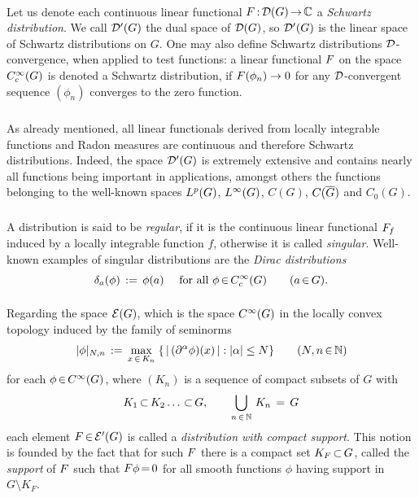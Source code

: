 \documentclass[11pt,twoside]{article}
\def\G{G}
\begin{document}
\paragraph{} %
Let us denote each continuous linear functional $\disF \: \D(\G) \xto \C$ 
a \textit{Schwartz distribution}.
We call $\D'(\G)$ the dual space of $\D(\G)$,
so $\D'(\G)$ is the linear space of Schwartz distributions on $\G$.
One may also define Schwartz distributions {\wrt} ${\mathcal{D}}$-convergence,
when applied to test functions:
a linear functional $F$ on the space $\TF$
is denoted a Schwartz distribution,
if $F(\phi_n) \to 0$ for any ${\mathcal{D}}$-convergent sequence $(\phi_n)$
converges to the zero function.

\subparagraph{}
As already mentioned,
all linear functionals derived from locally integrable functions
and Radon measures are continuous and therefore Schwartz distributions.
Indeed,
the space $\D'(\G)$ is extremely extensive
and contains nearly all functions being important in applications,
amongst others the functions
belonging to the well-known spaces $\Lp$, $\Li$, $C(\G)$,
$C(\clG)$ and $C_0(\G)$.

\subparagraph{}
A distribution is said to be \textit{regular},
if it is the continuous linear functional $F_f$
induced by a locally integrable function $f$,
otherwise it is called \textit{singular}.
Well-known examples of singular distributions are
the \textit{Dirac distributions}
\[
\delta_a(\phi) \, := \, \phi(a)
\qfa \phi \xeof \TF
\quad \quad  (a \xeof \G).
\]

\paragraph{} %
Regarding the space $\E(\G)$,
which is the space $\SF$ in the locally convex topology
induced by the family of seminorms
\[
\abs{\phi} _{N,n}
\, := \,
\max_{x \xeof K_n} \;
\{ \, \abs{\, (\PA \phi)(x) \,} : \abs{\alpha} \leq N \}
\quad \quad (N,n \xeof \N)
\]
for each $\phi \xeof \SF$,
where $(K_n)$ is a sequence of compact subsets of $\G$ with
\[
K_1 \xsubset K_2 \ldots \xsubset \G,
\quad \quad
\bigcup_{n \xeof \N} \, K_n \= \G
\]
each element $\disF \xeof \E'(\G)$ is called
a \textit{distribution with compact support}.
This notion is founded by the fact
that for such $F$ there is a compact set $K_F \xsubset \G$,
called the \textit{support} of $F$
such that
$F \phi {\,=\,} 0$ for all smooth functions $\phi$
having support in $\G \setminus K_F$.
\end{document}
